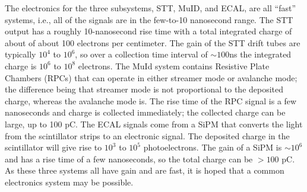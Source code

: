 The electronics for the three subsystems, STT, MuID, and ECAL, are all ``fast'' systems, 
i.e., all of the signals are %
in the few-to-10 nanosecond range.  The STT output has 
a roughly 10-nanosecond rise time with a total integrated charge of about of about 100 
electrons per centimeter.  The gain of the STT drift tubes are typically $10^4$ to $10^6$, 
so over a collection time interval of $\sim 100$ns
the integrated charge is  $10^6$ to $10^8$ electrons. 
The MuId system contains Resistive Plate Chambers (RPCs) that can operate 
in either streamer mode or avalanche mode; the difference 
being that streamer mode is not proportional to 
the deposited charge, whereas the avalanche mode 
is.  The rise time of the RPC signal is a few nanoseconds and charge is 
collected immediately; the collected charge can be large, up to 100 pC.  The ECAL 
signals come from a SiPM that converts the light from the 
scintillator strips to an electronic signal. The deposited charge in the scintillator 
will give rise to $10^3$ to $10^5$ photoelectrons.  The gain of a SiPM is $\sim10^6$ and 
has a rise time of a few nanoseconds, so the total charge can be $> 100$ pC. As these 
three systems all have gain and are fast, it is hoped that a 
common electronics system may be possible. 

